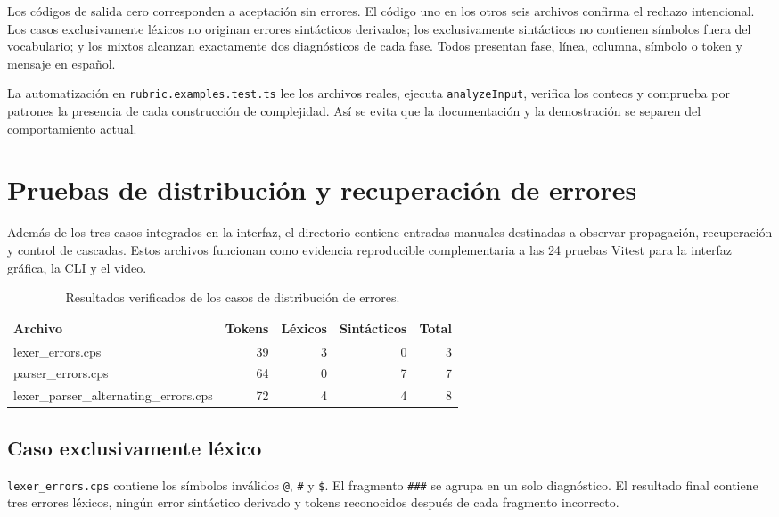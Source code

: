\documentclass[12pt,letterpaper,oneside]{report}
\newcommand{\archivo}[1]{\texttt{#1}}
\begin{document}
Los códigos de salida cero corresponden a aceptación sin errores. El código uno en
los otros seis archivos confirma el rechazo intencional. Los casos exclusivamente
léxicos no originan errores sintácticos derivados; los exclusivamente sintácticos no
contienen símbolos fuera del vocabulario; y los mixtos alcanzan exactamente dos
diagnósticos de cada fase. Todos presentan fase, línea, columna, símbolo o token y
mensaje en español.

La automatización en \archivo{rubric.examples.test.ts} lee los archivos reales,
ejecuta \archivo{analyzeInput}, verifica los conteos y comprueba por patrones la
presencia de cada construcción de complejidad. Así se evita que la documentación y
la demostración se separen del comportamiento actual.

\section{Pruebas de distribución y recuperación de errores}

Además de los tres casos integrados en la interfaz, el directorio
 contiene entradas manuales destinadas a
observar propagación, recuperación y control de cascadas. Estos archivos funcionan
como evidencia reproducible complementaria a las 24 pruebas Vitest para la
interfaz gráfica, la CLI y el video.

\begin{table}[H]
\centering
\caption{Resultados verificados de los casos de distribución de errores.}
\label{tab:distribucion-errores}
\begin{tabularx}{\textwidth}{>{\ttfamily}X r r r r}
\toprule
\normalfont Archivo & Tokens & Léxicos & Sintácticos & Total \\
\midrule
lexer\_errors.cps & 39 & 3 & 0 & 3 \\
parser\_errors.cps & 64 & 0 & 7 & 7 \\
lexer\_parser\_alternating\_errors.cps & 72 & 4 & 4 & 8 \\
\bottomrule
\end{tabularx}
\end{table}

\subsection{Caso exclusivamente léxico}

\archivo{lexer\_errors.cps} contiene los símbolos inválidos \archivo{@},
\archivo{\#} y \archivo{\$}. El fragmento \archivo{\#\#\#} se agrupa en un solo
diagnóstico. El resultado final contiene tres errores léxicos, ningún error
sintáctico derivado y tokens reconocidos después de cada fragmento incorrecto.
\end{document}
